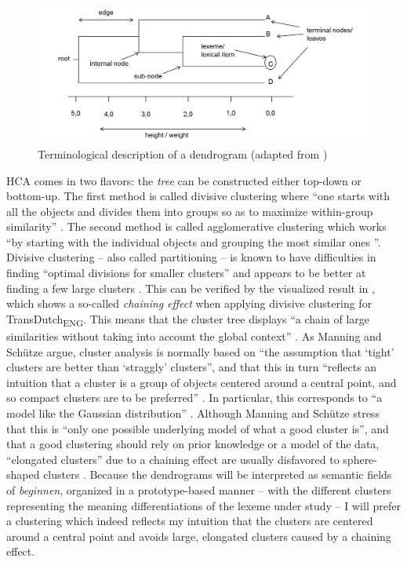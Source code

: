 \begin{figure}
\includegraphics[width=\textwidth]{figures/Vandevoorde2-img27.png}
\caption{\label{fig:3:27}  Terminological description of a dendrogram (adapted from \citealt[89]{everitt_cluster_2011})}
\end{figure}

HCA comes in two flavors: the \textit{tree} can be constructed either top-down or bottom-up. The first method is called divisive clustering where “one starts with all the objects and divides them into groups so as to maximize within-group similarity” \citep[501]{manning_foundations_1999}. The second method is called agglomerative clustering which works “by starting with the individual objects and grouping the most similar ones \citep[500--501]{manning_foundations_1999}”. Divisive clustering – also called partitioning – is known to have difficulties in finding “optimal divisions for smaller clusters” and appears to be better at finding a few large clusters \citep[138]{baayen_analyzing_2008}. This can be verified by the visualized result in , which shows a so-called \textit{chaining} \textit{effect} when applying divisive clustering for TransDutch\textsubscript{ENG}. This means that the cluster tree displays “a chain of large similarities without taking into account the global context” \citep[504]{manning_foundations_1999}. As Manning and Schütze argue, cluster analysis is normally based on “the assumption that ‘tight’ clusters are better than ‘straggly’ clusters”, and that this in turn “reflects an intuition that a cluster is a group of objects centered around a central point, and so compact clusters are to be preferred” \citep[506]{manning_foundations_1999}. In particular, this corresponds to “a model like the Gaussian distribution” \citep[506]{manning_foundations_1999}. Although Manning and Schütze stress that this is “only one possible underlying model of what a good cluster is”, and that a good clustering should rely on prior knowledge or a model of the data, “elongated clusters” due to a chaining effect are usually disfavored to sphere-shaped clusters \citep[506]{manning_foundations_1999}. Because the dendrograms will be interpreted as semantic fields of \textit{beginnen}, organized in a prototype-based manner – with the different clusters representing the meaning differentiations of the lexeme under study – I will prefer a clustering which indeed reflects my intuition that the clusters are centered around a central point and avoids large, elongated clusters caused by a chaining effect.

